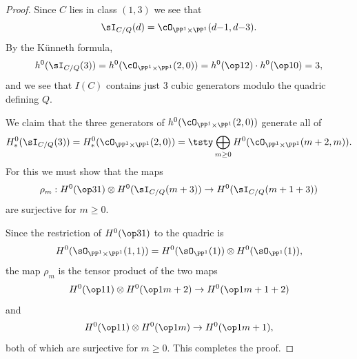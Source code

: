 \begin{proof}
Since $C$ lies in class $(1,3)$ we see that 
$$
\sI_{C/Q}(d) = \cO_{\PP^1\times \PP^1}(d{-}1, d{-}3)
.
$$
By the K\"unneth formula,
$$
h^0(\sI_{C/Q}(3)) = h^0(\cO_{\PP^1\times \PP^1}(2, 0)) = h^0(\op12)\cdot h^0(\op10) = 3,
$$
and we see that $I(C)$ contains just 3 cubic generators modulo the quadric defining $Q$. 

We claim that the three generators of $h^0(\cO_{\PP^1\times \PP^1}(2, 0))$ generate all of
$$
H^0_{*}(\sI_{C/Q}(3)) = H^0_{*}(\cO_{\PP^1\times \PP^1}(2, 0)) = 
\tsty
\bigoplus\limits_{m\geq 0}H^{0}(\cO_{\PP^1\times \PP^1}(m+2,m)).
$$
For this we must show that the maps
$$
\rho_{m}: H^{0}(\op31) \otimes H^0(\sI_{C/Q}(m+3)) \to H^0(\sI_{C/Q}(m+1+3))
$$
are surjective for $m\geq 0$.

Since the restriction
of $H^0(\op31)$ to the quadric is 
$$
H^0(\sO_{\PP^1\times \PP^1}(1,1)) = H^{0}(\sO_{\PP^{1}}(1)) \otimes H^{0}(\sO_{\PP^{1}}(1)),
$$
the map $\rho_{m}$
is the tensor product of the two maps
$$
H^{0}(\op11)\otimes H^{0}(\op1{m+2}) \to H^{0}(\op1{m+1+2})
$$
and 
$$
H^{0}(\op11)\otimes H^{0}(\op1{m}) \to H^{0}(\op1{m+1})
,
$$
both of which are surjective for $m\geq 0$. This completes the proof.
\end{proof}

